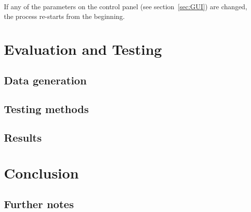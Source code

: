 \documentclass[11pt,a4paper]{vutinfth}
\begin{document}
If any of the parameters on the control panel (see section~\ref{sec:GUI}) are changed, the process re-starts from the beginning.






\chapter{Evaluation and Testing}

\section{Data generation} %

\section{Testing methods}

\section{Results}

\chapter{Conclusion}

\section{Further notes}





\backmatter %



\end{document}
